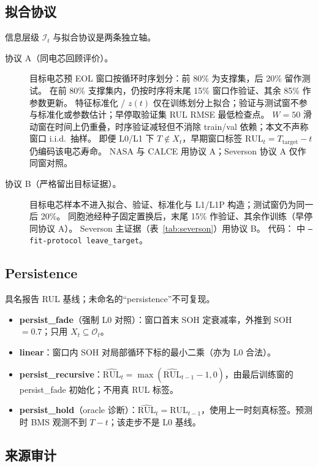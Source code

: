 \documentclass[UTF8,a4paper,12pt]{ctexart}
\begin{document}
\subsection{拟合协议}
\label{sec:fit}

信息层级 $\mathcal{I}_t$ 与拟合协议是两条独立轴。
\begin{description}
\item[协议 A（同电芯回顾评价）。]
目标电芯预 EOL 窗口按循环时序划分：前 80\% 为支撑集，后 20\% 留作测试。
在前 80\% 支撑集内，仍按时序将末尾 15\% 窗口作验证、其余 85\% 作参数更新。
特征标准化 / $z(t)$ 仅在训练划分上拟合；验证与测试窗不参与标准化或参数估计；早停取验证集 RUL RMSE 最低检查点。
$W{=}50$ 滑动窗在时间上仍重叠，时序验证减轻但不消除 train/val 依赖；本文不声称窗口 i.i.d.\ 抽样。
即便 L0/L1 下 $T\notin X_t$，早期窗口标签 $\mathrm{RUL}_t=T_{\mathrm{target}}-t$ 仍编码该电芯寿命。
NASA 与 CALCE 用协议 A；Severson 协议 A 仅作同窗对照。
\item[协议 B（严格留出目标证据）。]
目标电芯样本不进入拟合、验证、标准化与 L1/L1P 构造；测试窗仍为同一后 20\%。
同胞池经种子固定置换后，末尾 15\% 作验证、其余作训练（早停同协议 A）。
Severson 主证据（表~\ref{tab:severson}）用协议 B。
代码： 中 \texttt{--fit-protocol leave\_target}。
\end{description}

\subsection{Persistence}
\label{sec:persist}

具名报告 RUL 基线；未命名的``persistence''不可复现。
\begin{itemize}
\item \textbf{persist\_fade}（强制 L0 对照）：窗口首末 SOH 定衰减率，外推到 SOH$=0.7$；只用 $X_t\subseteq\mathcal{O}_t$。
\item \textbf{linear}：窗口内 SOH 对局部循环下标的最小二乘（亦为 L0 合法）。
\item \textbf{persist\_recursive}：$\widehat{\mathrm{RUL}}_t=\max(\widehat{\mathrm{RUL}}_{t-1}-1,0)$，由最后训练窗的 persist\_fade 初始化；不用真 RUL 标签。
\item \textbf{persist\_hold}（oracle 诊断）：$\widehat{\mathrm{RUL}}_t=\mathrm{RUL}_{t-1}$，使用上一时刻真标签。预测时 BMS 观测不到 $T-t$；该走步不是 L0 基线。
\end{itemize}

\subsection{来源审计}
\label{sec:audit}
\end{document}
